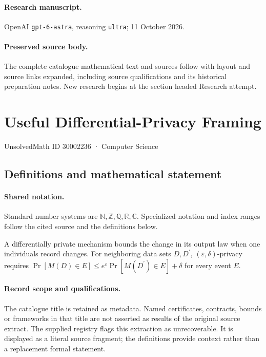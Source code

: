 \documentclass[11pt]{article}
\begin{document}
\paragraph{Research manuscript.} OpenAI \texttt{gpt-6-astra}, reasoning \texttt{ultra}; 11 October 2026.
\paragraph{Preserved source body.} The complete catalogue mathematical text and sources follow with layout and source links expanded, including source qualifications and its historical preparation notes. New research begins at the section headed Research attempt.

\section{Useful Differential-Privacy Framing}\label{30002236}
{\small UnsolvedMath ID 30002236 · Computer Science}
\subsection{Definitions and mathematical statement}

\paragraph{Shared notation.}Standard number systems are $\mathbb N,\mathbb Z,\mathbb Q,\mathbb R,\mathbb C$. Specialized notation and index ranges follow the cited source and the definitions below.


A differentially private mechanism bounds the change in its output law when one individual\textquotesingle s record changes. For neighboring data sets $D,D^{\prime}$, $(\varepsilon,\delta)$-privacy requires $\Pr[M(D)\in E]\leq e^\varepsilon\Pr[M(D^{\prime})\in E]+\delta$ for every event $E$.
\paragraph{Record scope and qualifications.}
The catalogue title is retained as metadata. Named certificates, contracts, bounds or frameworks in that title are not asserted as results of the original source extract.
The supplied registry flags this extraction as unrecoverable. It is displayed as a literal source fragment; the definitions provide context rather than a replacement formal statement.
\end{document}

